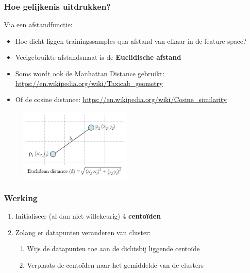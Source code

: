 \documentclass{article}
\begin{document}
\subsubsection{Hoe gelijkenis uitdrukken?}

Via een afstandfunctie:

\begin{itemize}
    \item Hoe dicht liggen trainingssamples qua afstand van elkaar in de feature space?
    \item Veelgebruikte afstandsmaat is de \textbf{Euclidische afstand}
    \item Soms wordt ook de Manhattan Distance gebruikt: \url{https://en.wikipedia.org/wiki/Taxicab_geometry}
    \item Of de cosine distance: \url{https://en.wikipedia.org/wiki/Cosine_similarity}
\end{itemize}

\begin{figure}[H]
    \centering
    \includegraphics[width=0.5\textwidth]{k-means-euclidische-afstand.png}
\end{figure}

\subsubsection{Werking}

\begin{enumerate}
    \item Initialiseer (al dan niet willekeurig) 4 \textbf{centoïden}
    \item Zolang er datapunten veranderen van cluster:
    \begin{enumerate}
        \item Wijs de datapunten toe aan de dichtsbij liggende centoïde 
        \item Verplaats de centoïden naar het gemiddelde van de clusters
    \end{enumerate}
\end{enumerate}
\end{document}
